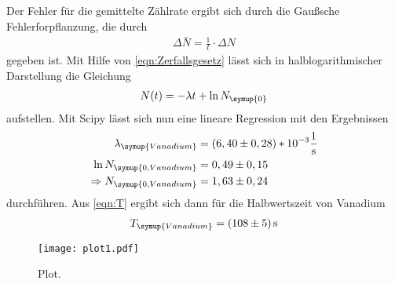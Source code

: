 Der Fehler für die gemittelte Zählrate ergibt sich durch die Gaußsche Fehlerforpflanzung, die durch
\begin{align*}
  \Delta\bar{N} = \frac{1}{t}\cdot\Delta N
\end{align*}
gegeben ist. Mit Hilfe von \autoref{eqn:Zerfallsgesetz} lässt sich in halblogarithmischer Darstellung die
Gleichung
\begin{align*}
  N(t) = -\lambda t + \ln{N_{\symup{0}}}
\end{align*}
aufstellen. Mit Scipy lässt sich nun eine lineare Regression mit den Ergebnissen
\begin{align*}
  \lambda_{\symup{Vanadium}} &= (6,40 \pm 0,28)*10^{-3} \frac{1}{\unit{\second}} \\
  \ln{N_{\symup{0, Vanadium}}} &= 0,49 \pm 0,15 \\
  \Rightarrow N_{\symup{0, Vanadium}} &= 1,63 \pm 0,24 \\
\end{align*}
durchführen. Aus \autoref{eqn:T} ergibt sich dann für die Halbwertszeit von Vanadium
\begin{align*}
  T_{\symup{Vanadium}} = (108 \pm 5)\,\unit{\second}
\end{align*}

\begin{figure}
  \centering
  \texttt{[image: plot1.pdf]}
  \caption{Plot.}
  \label{fig:vanadium}
\end{figure}
